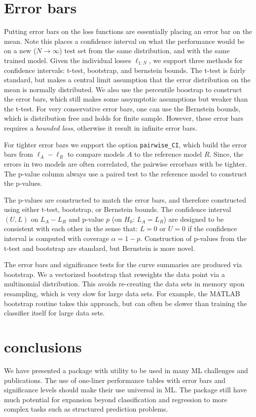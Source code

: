 \documentclass{article}
\newcommand{\code}{\texttt}
\begin{document}
\section{Error bars}

Putting error bars on the loss functions are essentially placing an error bar on the mean.
Note this places a confidence interval on what the performance would be on a new ($N \rightarrow \infty$) test set from the same distribution, and with the same trained model.
Given the individual losses $\ell_{1:N}$, we support three methods for confidence intervals: t-test, bootstrap, and bernstein bounds.
The t-test is fairly standard, but makes a central limit assumption that the error distribution on the mean is normally distributed.
We also use the percentile boostrap to construct the error bars, which still makes some assymptotic assumptions but weaker than the t-test.
For very conservative error bars, one can use the Bernstein bounds, which is distribution free and holds for finite sample.  %
However, these error bars requires a \emph{bounded loss}, otherwise it result in infinite error bars.

For tighter error bars we support the option \code{pairwise\_CI}, which build the error bars from $\ell_A - \ell_R$ to compare models $A$ to the reference model $R$.
Since, the errors in two models are often correlated, the pairwise errorbars with be tighter.
The p-value column always use a paired test to the reference model to construct the p-values.

The p-values are constructed to match the error bars, and therefore constructed using either t-test, bootstrap, or Bernstein bounds.
The confidence interval $(U,L)$ on $L_A - L_R$ and p-value $p$ (on $H_0$: $L_A = L_R$) are designed to be consistent with each other in the sense that: $L = 0$ or $U = 0$ if the confidence interval is computed with coverage $\alpha=1-p$.
Construction of p-values from the t-test and bootstrap are standard, but Bernstein is more novel.

The error bars and significance tests for the curve summaries are produced via bootstrap.
We a vectorized bootstrap that reweights the data point via a multinomial distribution.
This avoids re-creating the data sets in memory upon resampling, which is very slow for large data sets.
For example, the MATLAB bootstrap routine takes this approach, but can often be slower than training the classifier itself for large data sets.  %

\section{conclusions}

We have presented a package with utility to be used in many ML challenges and publications.
The use of one-liner performance tables with error bars and significance levels should make their use universal in ML\@.
The package still have much potential for expansion beyond classification and regression to more complex tasks such as structured prediction problems.


\end{document}
